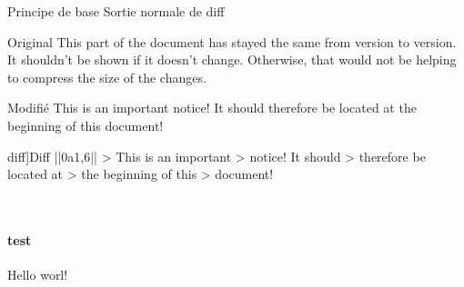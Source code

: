 \documentclass[10pt,xcolor={dvipsnames}]{beamer}
\begin{document}
\begin{frame}[fragile]{Principe de base}
Sortie normale de diff

\begin{tcbraster}[raster columns=3, raster valign=top]
      \begin{snvlisting}{Original}
This part of the
document has stayed the
same from version to
version.  It shouldn't
be shown if it doesn't
change.  Otherwise, that
would not be helping to
compress the size of the
changes.
      \end{snvlisting}
      \begin{snvlisting}{Modifié}
This is an important
notice! It should
therefore be located at
the beginning of this
document!
      \end{snvlisting}
      \begin{tcolorbox}[blanker]
      \begin{tcbraster}[raster columns=1, raster rows=2]
      \begin{snvlisting}[[normal]diff]{Diff}
||0a1,6||
> This is an important
> notice! It should
> therefore be located at
> the beginning of this
> document!
      \end{snvlisting}
      \
      \end{tcbraster}
      \end{tcolorbox}
\end{tcbraster}
\end{frame}

\begin{frame}
    \framesubtitle{test}
    Hello worl!
\end{frame}
\end{document}
